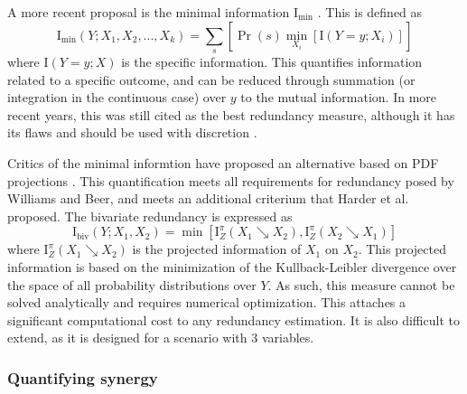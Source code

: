 \documentclass[../main.tex]{subfiles}
\begin{document}
A more recent proposal is the minimal information $\mathrm{I}_\mathrm{min}$ \cite{williams2010nonnegative}.
This is defined as
%
\begin{equation}
\mathrm{I}_\mathrm{min} \left( Y;{X_1, X_2,...,X_k} \right) = \sum_s [\Pr \left( s \right) \min_{X_i} [\mathrm{I}\left( Y=y;X_i \right)]]
\end{equation}
%
where $\mathrm{I}\left( Y = y;X \right)$ is the specific information.
This quantifies information related to a specific outcome, and can be reduced through summation (or integration in the continuous case) over $y$ to the mutual information.
In more recent years, this was still cited as the best redundancy measure, although it has its flaws and should be used with discretion \cite{lizier2013towards, olbrich2015information}.

Critics of the minimal informtion have proposed an alternative based on PDF projections \cite{harder2013bivariate}.
This quantification meets all requirements for redundancy posed by Williams and Beer, and meets an additional criterium that Harder et al. proposed.
The bivariate redundancy is expressed as
%
\begin{equation}
\mathrm{I}_\mathrm{biv} \left( Y;{X_1, X_2} \right) = \min [\mathrm{I}_Z^\pi \left( X_1 \searrow X_2 \right), \mathrm{I}_Z^\pi \left( X_2 \searrow X_1 \right)] 
\end{equation}
%
where $\mathrm{I}_Z^\pi \left( X_1 \searrow X_2 \right)$ is the projected information of $X_1$ on $X_2$.
This projected information is based on the minimization of the Kullback-Leibler divergence over the space of all probability distributions over $Y$.
As such, this measure cannot be solved analytically and requires numerical optimization.
This attaches a significant computational cost to any redundancy estimation.
It is also difficult to extend, as it is designed for a scenario with 3 variables. %

\subsubsection{Quantifying synergy}
\end{document}
